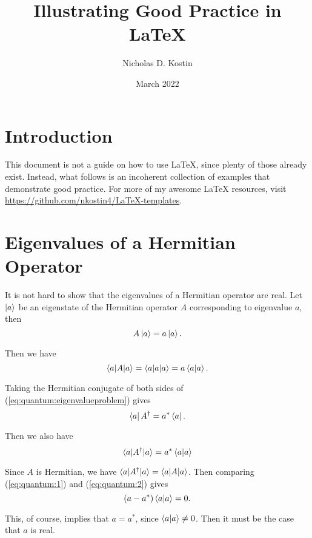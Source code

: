 \documentclass{article}
\title{Illustrating Good Practice in {\LaTeX}}
\author{Nicholas D. Kostin}
\date{March 2022}
\numberwithin{equation}{section}
\begin{document}
\maketitle

\section{Introduction}

This document is not a guide on how to use {\LaTeX}, since plenty of those already exist. Instead, what follows is an incoherent collection of examples that demonstrate good practice. For more of my awesome {\LaTeX} resources, visit \url{https://github.com/nkostin4/LaTeX-templates}.

\section{Eigenvalues of a Hermitian Operator}

It is not hard to show that the eigenvalues of a Hermitian operator are real. Let $\ket{a}$ be an eigenstate of the Hermitian operator $A$ corresponding to eigenvalue $a$, then
\begin{equation}
    A \ket{a} = a \ket{a}. \label{eq:quantum:eigenvalueproblem}
\end{equation}

Then we have
\begin{equation}
    \braket{a|A|a} = \braket{a|a|a} = a\braket{a|a}. \label{eq:quantum:1}
\end{equation}

Taking the Hermitian conjugate of both sides of (\ref{eq:quantum:eigenvalueproblem}) gives
\begin{equation}
    \bra{a} A^{\dagger} = a^{*} \bra{a}.
\end{equation}

Then we also have
\begin{equation}
    \braket{a|A^{\dagger}|a} = a^{*} \braket{a|a} \label{eq:quantum:2}
\end{equation}

Since $A$ is Hermitian, we have $\braket{a|A^{\dagger}|a} = \braket{a|A|a}$. Then comparing (\ref{eq:quantum:1}) and (\ref{eq:quantum:2}) gives
\begin{equation*}
    \left( a - a^* \right) \braket{a|a} = 0.
\end{equation*}

This, of course, implies that $a = a^*$, since $\braket{a|a} \neq 0$. Then it must be the case that $a$ is real.
\end{document}
